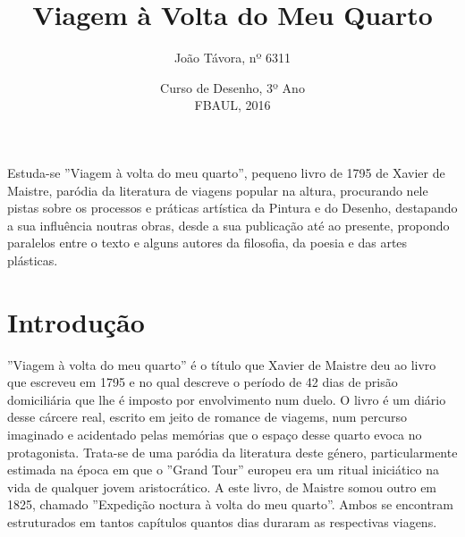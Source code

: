 \documentclass[12pt]{article}
\title{\large{Viagem à Volta do Meu Quarto}}
\author{\vspace*{-3ex}João Távora, nº 6311}
\date{\vspace*{-3ex}Curso de Desenho, 3º Ano\\\vspace*{-1ex}FBAUL, 2016}
\begin{document}

\maketitle

\renewcommand\contentsname{Sumário}
\tableofcontents

\begin{spacing}{1.0}
\begin{small}
  \section{\fontsize{11}{13}\selectfont{Resumo}}

    \noindent Estuda-se ''Viagem à volta do meu quarto'', pequeno livro de 1795 de
    Xavier de Maistre, paródia da literatura de viagens popular na altura,
    procurando nele pistas sobre os processos e práticas artística da
    Pintura e do Desenho, destapando a sua influência noutras obras, desde
    a sua publicação até ao presente, propondo paralelos entre o texto e
    alguns autores da filosofia, da poesia e das artes plásticas.
\end{small}

\end{spacing}
\vspace*{-1ex}

\section{Introdução}

''Viagem à volta do meu quarto'' é o título que Xavier de Maistre deu
ao livro que escreveu em 1795 e no qual descreve o período de 42 dias
de prisão domiciliária que lhe é imposto por envolvimento num duelo. O
livro é um diário desse cárcere real, escrito em jeito de romance de
viagems, num percurso imaginado e acidentado pelas memórias que o
espaço desse quarto evoca no protagonista. Trata-se de uma paródia da
literatura deste género, particularmente estimada na época em que o
''Grand Tour'' europeu era um ritual iniciático na vida de qualquer
jovem aristocrático. A este livro, de Maistre somou outro em 1825,
chamado ''Expedição noctura à volta do meu quarto''. Ambos se
encontram estruturados em tantos capítulos quantos dias duraram as
respectivas viagens.
\end{document}
